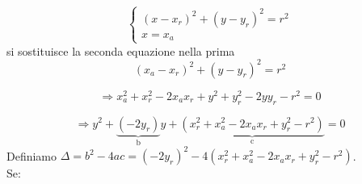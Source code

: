 \begin{equation} 
\begin{cases}

    (x-x_r)^2+(y-y_r)^2=r^2
   \\
    x=x_a 
  \end{cases} 
\end{equation}
si sostituisce la seconda equazione nella prima
\begin{equation*}
(x_a-x_r)^2+(y-y_r)^2=r^2
\end{equation*}

\begin{equation}
\Rightarrow x_a^2+x_r^2-2x_ax_r+y^2+y_r^2-2yy_r-r^2=0
\end{equation}

\begin{equation*}
\Rightarrow y^2+\underbrace{(-2y_r)}_\text{b}y+\underbrace{(x_r^2+x_a^2-2x_ax_r+y_r^2-r^2)}_\text{c}=0
\end{equation*}
Definiamo $\Delta=b^2-4ac=(-2y_r)^2-4(x_r^2+x_a^2-2x_ax_r+y_r^2-r^2)$. \\Se:
